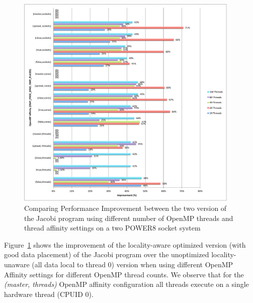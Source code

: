 \begin{figure}[h!]
  \centering
  \includegraphics[height=1.4\textwidth, width=0.95\textwidth]{./Images/ImpAllV.pdf}
       \caption{Comparing Performance Improvement between the two version of the Jacobi program using 
       different number of OpenMP threads and thread affinity settings on a two POWER8 socket system}
       \label{fig:imp}
\end{figure}

Figure~\ref{fig:imp} shows the improvement of the locality-aware optimized version (with good data placement) of the Jacobi program over the unoptimized locality-unaware (all data local to thread 0) version when using different OpenMP Affinity settings for different OpenMP thread counts. 
We observe that for the \textit{(master, threads)} OpenMP affinity configuration all threads execute on a single hardware thread (CPUID 0).
 
